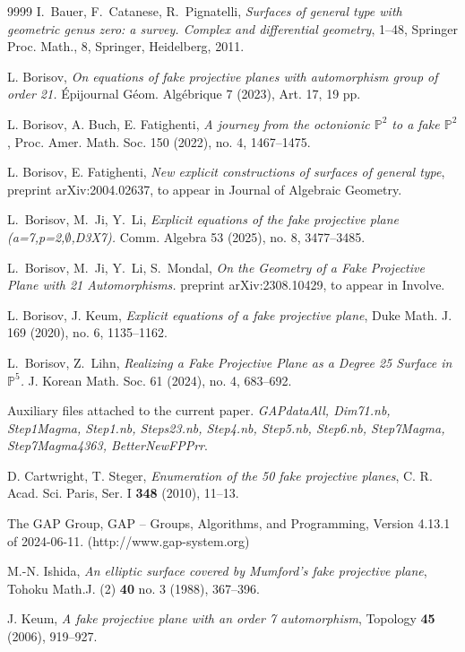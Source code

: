\documentclass[11pt,reqno]{amsart}
\def\P {{\mathbb P}}
\theoremstyle{definition}
\numberwithin{equation}{section}
\begin{document}
\begin{thebibliography}{9999}
I.~Bauer, F.~Catanese, R.~Pignatelli, {\em Surfaces of general type with geometric genus zero: a survey. Complex and differential geometry}, 1--48, Springer Proc. Math., 8, Springer, Heidelberg, 2011. 


L. Borisov,
{\em On equations of fake projective planes with automorphism group of order 21.}
\'Epijournal G\'eom. Alg\'ebrique 7 (2023), Art. 17, 19 pp.

L. Borisov, A. Buch, E. Fatighenti, {\em A journey from the octonionic $\P^2$ to a fake $\P^2$}, 
Proc. Amer. Math. Soc. 150 (2022), no. 4, 1467--1475.

L. Borisov,  E. Fatighenti, {\em New explicit constructions of surfaces of general type}, preprint arXiv:2004.02637, to appear in Journal of Algebraic Geometry.

L.~Borisov, M.~Ji, Y.~Li, 
{\em Explicit equations of the fake projective plane (a=7,p=2,$\emptyset$,D3X7).}
Comm. Algebra 53 (2025), no. 8, 3477--3485.

L.~Borisov, M.~Ji, Y.~Li, S.~Mondal,
{\em On the Geometry of a Fake} {\em Projective Plane with 21 Automorphisms.}
preprint arXiv:2308.10429, to appear in Involve.

L. Borisov, J. Keum, {\em Explicit equations of a fake projective plane}, 
Duke Math. J. 169 (2020), no. 6, 1135--1162.


L.~Borisov, Z.~Lihn,
{\em Realizing a Fake Projective Plane as a Degree 25 Surface in $\mathbb P^5$.}
J. Korean Math. Soc. 61 (2024), no. 4, 683--692.

 Auxiliary files attached to the current paper. \emph{GAPdataAll, Dim71.nb, Step1Magma, Step1.nb, Steps23.nb, Step4.nb, Step5.nb, Step6.nb, Step7Magma, Step7Magma4363, BetterNewFPPrr}.

 D. Cartwright, T. Steger,
{\em Enumeration of the 50 fake projective planes}, C. R. Acad.
Sci. Paris, Ser. I {\bf 348} (2010), 11--13.

The GAP Group, GAP -- Groups, Algorithms, and Programming, Version 4.13.1 of 2024-06-11. (http://www.gap-system.org)

 M.-N. Ishida, {\em An elliptic surface covered by Mumford's fake projective plane}, Tohoku Math.J. (2) {\bf 40} no. 3 (1988), 367--396.

 J. Keum, {\em A fake projective plane with an order 7 automorphism}, Topology {\bf 45} (2006), 919--927.


\end{thebibliography}
\end{document}
